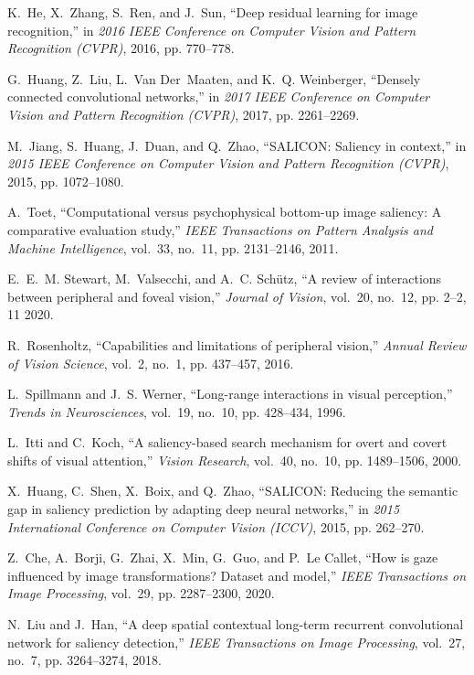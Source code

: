 \documentclass{article}
\begin{document}
\begin{thebibliography}{10}
K.~{He}, X.~{Zhang}, S.~{Ren}, and J.~{Sun}, ``Deep residual learning for image
  recognition,'' in \emph{2016 IEEE Conference on Computer Vision and Pattern
  Recognition (CVPR)}, 2016, pp. 770--778.

G.~Huang, Z.~Liu, L.~Van Der~Maaten, and K.~Q. Weinberger, ``Densely connected
  convolutional networks,'' in \emph{2017 IEEE Conference on Computer Vision
  and Pattern Recognition (CVPR)}, 2017, pp. 2261--2269.

M.~{Jiang}, S.~{Huang}, J.~{Duan}, and Q.~{Zhao}, ``{SALICON}: Saliency in
  context,'' in \emph{2015 IEEE Conference on Computer Vision and Pattern
  Recognition (CVPR)}, 2015, pp. 1072--1080.

A.~Toet, ``Computational versus psychophysical bottom-up image saliency: A
  comparative evaluation study,'' \emph{IEEE Transactions on Pattern Analysis
  and Machine Intelligence}, vol.~33, no.~11, pp. 2131--2146, 2011.

E.~E.~M. Stewart, M.~Valsecchi, and A.~C. Schütz, ``{A review of interactions
  between peripheral and foveal vision},'' \emph{Journal of Vision}, vol.~20,
  no.~12, pp. 2--2, 11 2020.

R.~Rosenholtz, ``Capabilities and limitations of peripheral vision,''
  \emph{Annual Review of Vision Science}, vol.~2, no.~1, pp. 437--457, 2016.

L.~Spillmann and J.~S. Werner, ``Long-range interactions in visual
  perception,'' \emph{Trends in Neurosciences}, vol.~19, no.~10, pp. 428--434,
  1996.

L.~Itti and C.~Koch, ``A saliency-based search mechanism for overt and covert
  shifts of visual attention,'' \emph{Vision Research}, vol.~40, no.~10, pp.
  1489--1506, 2000.

X.~{Huang}, C.~{Shen}, X.~{Boix}, and Q.~{Zhao}, ``{SALICON}: Reducing the
  semantic gap in saliency prediction by adapting deep neural networks,'' in
  \emph{2015 International Conference on Computer Vision (ICCV)}, 2015, pp.
  262--270.

Z.~{Che}, A.~{Borji}, G.~{Zhai}, X.~{Min}, G.~{Guo}, and P.~{Le Callet}, ``How
  is gaze influenced by image transformations? {Dataset} and model,''
  \emph{IEEE Transactions on Image Processing}, vol.~29, pp. 2287--2300, 2020.

N.~Liu and J.~Han, ``A deep spatial contextual long-term recurrent
  convolutional network for saliency detection,'' \emph{IEEE Transactions on
  Image Processing}, vol.~27, no.~7, pp. 3264--3274, 2018.


\end{thebibliography}
\end{document}

